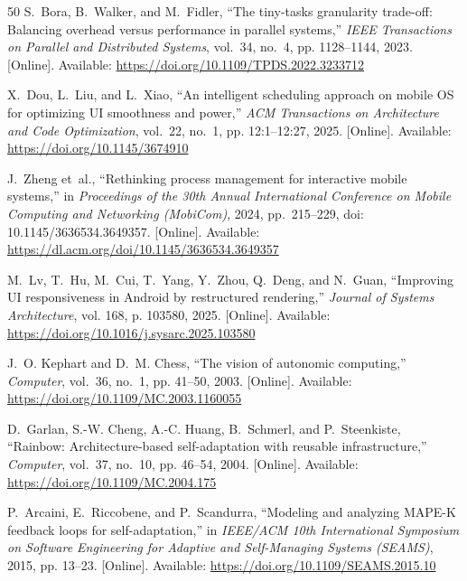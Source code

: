 \documentclass[14pt,a4paper,oneside]{extreport}
\begin{document}
\begin{thebibliography}{50}
\BIBentryALTinterwordspacing
S.~Bora, B.~Walker, and M.~Fidler, ``The tiny-tasks granularity trade-off:
  Balancing overhead versus performance in parallel systems,'' \emph{IEEE
  Transactions on Parallel and Distributed Systems}, vol.~34, no.~4, pp.
  1128--1144, 2023. [Online]. Available:
  \url{https://doi.org/10.1109/TPDS.2022.3233712}
\BIBentrySTDinterwordspacing

\BIBentryALTinterwordspacing
X.~Dou, L.~Liu, and L.~Xiao, ``An intelligent scheduling approach on mobile
  {OS} for optimizing {UI} smoothness and power,'' \emph{ACM Transactions on
  Architecture and Code Optimization}, vol.~22, no.~1, pp. 12:1--12:27, 2025.
  [Online]. Available: \url{https://doi.org/10.1145/3674910}
\BIBentrySTDinterwordspacing

J.~Zheng et~al., ``Rethinking process management for interactive mobile systems,''
in \emph{Proceedings of the 30th Annual International Conference on Mobile
Computing and Networking (MobiCom)}, 2024, pp.~215--229,
doi: 10.1145/3636534.3649357. [Online]. Available:
\url{https://dl.acm.org/doi/10.1145/3636534.3649357}

\BIBentryALTinterwordspacing
M.~Lv, T.~Hu, M.~Cui, T.~Yang, Y.~Zhou, Q.~Deng, and N.~Guan, ``Improving {UI}
  responsiveness in {Android} by restructured rendering,'' \emph{Journal of
  Systems Architecture}, vol. 168, p. 103580, 2025. [Online]. Available:
  \url{https://doi.org/10.1016/j.sysarc.2025.103580}
\BIBentrySTDinterwordspacing

\BIBentryALTinterwordspacing
J.~O. Kephart and D.~M. Chess, ``The vision of autonomic computing,''
  \emph{Computer}, vol.~36, no.~1, pp. 41--50, 2003. [Online]. Available:
  \url{https://doi.org/10.1109/MC.2003.1160055}
\BIBentrySTDinterwordspacing

\BIBentryALTinterwordspacing
D.~Garlan, S.-W. Cheng, A.-C. Huang, B.~Schmerl, and P.~Steenkiste, ``Rainbow:
  Architecture-based self-adaptation with reusable infrastructure,''
  \emph{Computer}, vol.~37, no.~10, pp. 46--54, 2004. [Online]. Available:
  \url{https://doi.org/10.1109/MC.2004.175}
\BIBentrySTDinterwordspacing

\BIBentryALTinterwordspacing
P.~Arcaini, E.~Riccobene, and P.~Scandurra, ``Modeling and analyzing {MAPE-K}
  feedback loops for self-adaptation,'' in \emph{IEEE/ACM 10th International
  Symposium on Software Engineering for Adaptive and Self-Managing Systems
  (SEAMS)}, 2015, pp. 13--23. [Online]. Available:
  \url{https://doi.org/10.1109/SEAMS.2015.10}
\BIBentrySTDinterwordspacing


\end{thebibliography}
\end{document}
